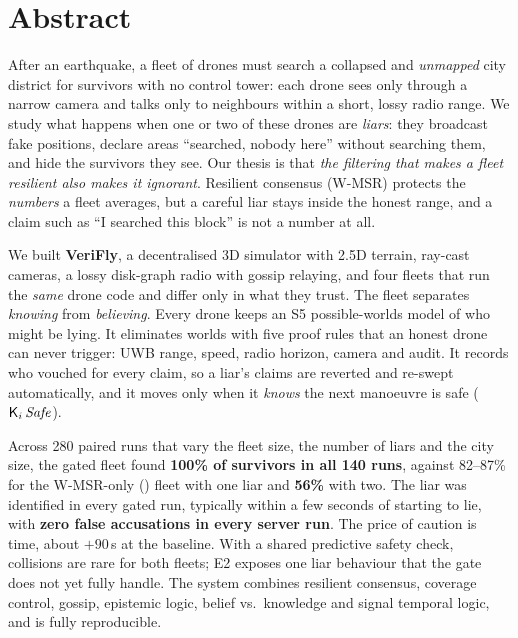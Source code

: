 \chapter*{Abstract}
\thispagestyle{plain}

After an earthquake, a fleet of drones must search a collapsed and \emph{unmapped} city district for survivors with no
control tower: each drone sees only through a narrow camera and talks only to neighbours within a short, lossy radio
range. We study what happens when one or two of these drones are \emph{liars}: they broadcast fake positions,
declare areas ``searched, nobody here'' without searching them, and hide the survivors they see. Our thesis is that
\emph{the filtering that makes a fleet resilient also makes it ignorant}. Resilient consensus (W-MSR) protects the
\emph{numbers} a fleet averages, but a careful liar stays inside the honest range, and a claim such as ``I searched this
block'' is not a number at all.

We built \textbf{VeriFly}, a decentralised 3D simulator with 2.5D terrain, ray-cast cameras, a lossy disk-graph radio
with gossip relaying, and four fleets that run the \emph{same} drone code and differ only in what they trust. The
\gated{} fleet separates \emph{knowing} from \emph{believing}. Every drone keeps an S5 possible-worlds model of who might
be lying. It eliminates worlds with five proof rules that an honest drone can never trigger: UWB range, speed, radio
horizon, camera and audit. It records who vouched for every claim, so a liar's claims are reverted and re-swept
automatically, and it moves only when it \emph{knows} the next manoeuvre is safe ($\mathsf{K}_i\,\mathit{Safe}$).

Across 280 paired runs that vary the fleet size, the number of liars and the city size, the gated fleet found
\textbf{100\% of survivors in all 140 runs}, against 82--87\% for the W-MSR-only (\naive{}) fleet with one liar and
\textbf{56\%} with two. The liar was identified in every gated run, typically within a few seconds of starting to lie,
with \textbf{zero false accusations in every server run}. The price of caution is time, about $+90$\,s at the baseline.
With a shared predictive safety check, collisions are rare for both fleets; E2 exposes one liar behaviour that the gate
does not yet fully handle. The system combines resilient consensus, coverage control, gossip, epistemic logic, belief
vs.\ knowledge and signal temporal logic, and is fully reproducible.



